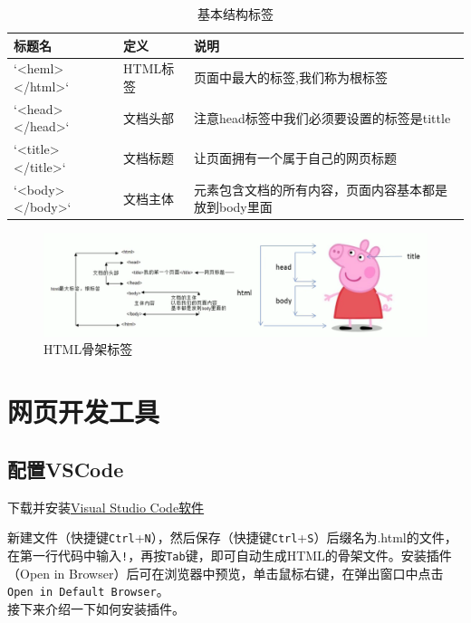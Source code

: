 \documentclass[
]{book}
\begin{document}
\begin{table}

\caption{\label{tab:unnamed-chunk-4}基本结构标签}
\centering
\begin{tabular}[t]{lll}
\toprule
标题名 & 定义 & 说明\\
\midrule
`<heml></html>` & HTML标签 & 页面中最大的标签,我们称为根标签\\
`<head></head>` & 文档头部 & 注意head标签中我们必须要设置的标签是tittle\\
`<title></title>` & 文档标题 & 让页面拥有一个属于自己的网页标题\\
`<body></body>` & 文档主体 & 元素包含文档的所有内容，页面内容基本都是放到body里面\\
\bottomrule
\end{tabular}
\end{table}

\begin{figure}

{\centering \includegraphics{fig/1-2} 

}

\caption{HTML骨架标签}\label{fig:unnamed-chunk-5}
\end{figure}

\hypertarget{ux7f51ux9875ux5f00ux53d1ux5de5ux5177}{%
\chapter{网页开发工具}\label{ux7f51ux9875ux5f00ux53d1ux5de5ux5177}}

\hypertarget{ux914dux7f6evscode}{%
\section{配置VSCode}\label{ux914dux7f6evscode}}

下载并安装\href{https://code.visualstudio.com/download}{Visual Studio Code软件}

新建文件（快捷键\texttt{Ctrl}+\texttt{N}），然后保存（快捷键\texttt{Ctrl}+\texttt{S}）后缀名为.html的文件，在第一行代码中输入\texttt{!}，再按\texttt{Tab}键，即可自动生成HTML的骨架文件。安装插件（Open in Browser）后可在浏览器中预览，单击鼠标右键，在弹出窗口中点击\texttt{Open\ in\ Default\ Browser}。\\
接下来介绍一下如何安装插件。
\end{document}
